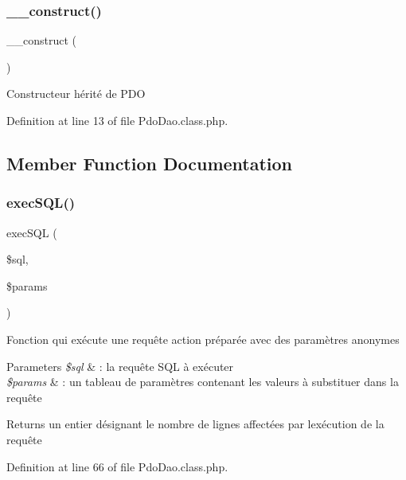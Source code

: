 \subsubsection{\texorpdfstring{\+\_\+\+\_\+construct()}{\_\_construct()}}
{\footnotesize\ttfamily \+\_\+\+\_\+construct (\begin{DoxyParamCaption}{ }\end{DoxyParamCaption})}

Constructeur hérité de P\+DO 

Definition at line 13 of file Pdo\+Dao.\+class.\+php.



\subsection{Member Function Documentation}
\mbox{\label{class_pdo_dao_a5ba34a0a513050a7983c8c9f03a30732}} 
\subsubsection{\texorpdfstring{exec\+S\+Q\+L()}{execSQL()}}
{\footnotesize\ttfamily exec\+S\+QL (\begin{DoxyParamCaption}\item[{}]{\$sql,  }\item[{}]{\$params }\end{DoxyParamCaption})}

Fonction qui exécute une requête action préparée avec des paramètres anonymes 
\begin{DoxyParams}{Parameters}
{\em \$sql} & \+: la requête S\+QL à exécuter \\
\hline
{\em \$params} & \+: un tableau de paramètres contenant les valeurs à substituer dans la requête \\
\hline
\end{DoxyParams}
\begin{DoxyReturn}{Returns}
un entier désignant le nombre de lignes affectées par l\textquotesingle{}exécution de la requête 
\end{DoxyReturn}


Definition at line 66 of file Pdo\+Dao.\+class.\+php.

\mbox{\label{class_pdo_dao_a12c1ef0decfa06f2f07cb681f3be8c50}} 
